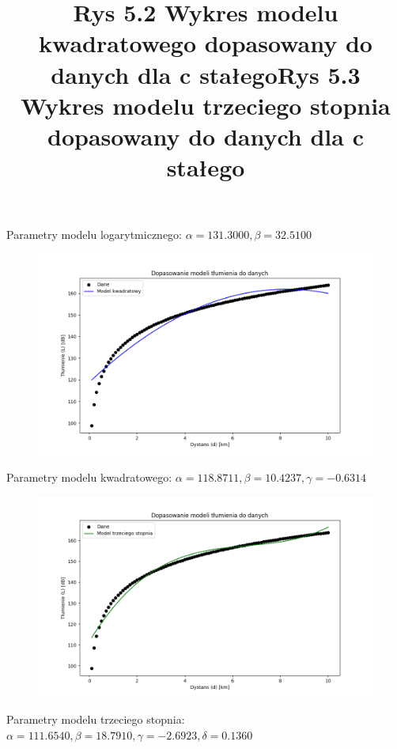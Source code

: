\documentclass{article}
\begin{document}
Parametry modelu logarytmicznego: $\alpha = 131.3000, \beta = 32.5100$\newpage
\begin{figure}[h]
  \includegraphics[scale=0.4]{kwadrat3.png}
  \title{Rys 5.2 Wykres modelu kwadratowego dopasowany do danych dla c stałego}
  \centering
\end{figure}
Parametry modelu kwadratowego: $\alpha = 118.8711, \beta = 10.4237, \gamma = -0.6314$\newpage
\begin{figure}[h]
  \includegraphics[scale=0.4]{trzy3.png}
  \title{Rys 5.3 Wykres modelu trzeciego stopnia dopasowany do danych dla c stałego}
  \centering
\end{figure}
Parametry modelu trzeciego stopnia: $\alpha = 111.6540, \beta = 18.7910, \gamma = -2.6923, \delta = 0.1360$ \newpage
\end{document}
